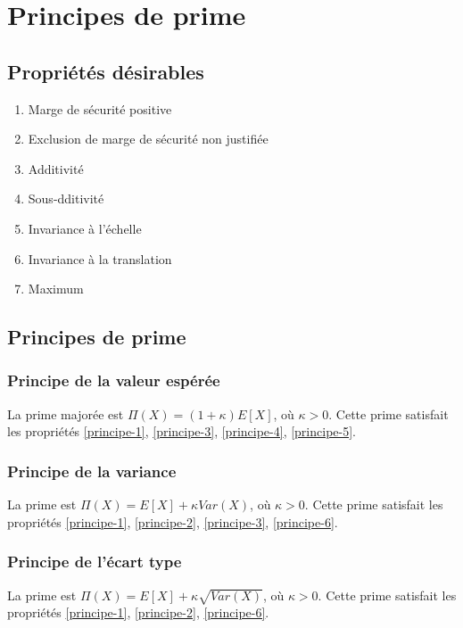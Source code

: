 \chapter{Principes de prime}

\section{Propriétés désirables}

\begin{enumerate}
	\item Marge de sécurité positive\label{principe-1}
	\item Exclusion de marge de sécurité non justifiée\label{principe-2}
	\item Additivité\label{principe-3}
	\item Sous-dditivité\label{principe-4}
	\item Invariance à l'échelle\label{principe-5}
	\item Invariance à la translation\label{principe-6}
	\item Maximum\label{principe-7}
\end{enumerate}

\section{Principes de prime}

\subsection{Principe de la valeur espérée}
La prime majorée est $\Pi(X) = (1 + \kappa)E[X]$, où $\kappa > 0$. Cette prime satisfait les propriétés \ref{principe-1}, \ref{principe-3}, \ref{principe-4}, \ref{principe-5}.

\subsection{Principe de la variance}
La prime est $\Pi(X) = E[X] + \kappa Var(X)$, où $\kappa > 0$. Cette prime satisfait les propriétés \ref{principe-1}, \ref{principe-2}, \ref{principe-3}, \ref{principe-6}.

\subsection{Principe de l'écart type}
La prime est $\Pi(X) = E[X] + \kappa \sqrt{Var(X)}$, où $\kappa > 0$. Cette prime satisfait les propriétés \ref{principe-1}, \ref{principe-2}, \ref{principe-6}.

